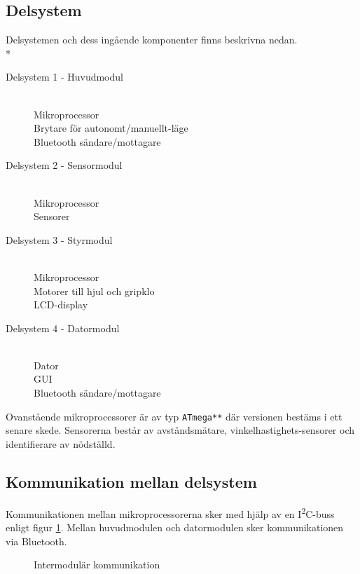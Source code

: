 \documentclass[11pt]{article}
\begin{document}
\begin{flushleft}
\subsection{Delsystem}
Delsystemen och dess ingående komponenter finns beskrivna nedan. \\*
\vspace{1em}
\begin{minipage}{\textwidth}
\begin{description}
	\item[Delsystem 1 - Huvudmodul] \hfill \\
	Mikroprocessor \\
	Brytare för autonomt/manuellt-läge \\
	Bluetooth\textsuperscript{\circledR} sändare/mottagare
	\item[Delsystem 2 - Sensormodul] \hfill \\
	Mikroprocessor \\
	Sensorer
	\item[Delsystem 3 - Styrmodul] \hfill \\
	Mikroprocessor \\
	Motorer till hjul och gripklo \\
	LCD-display
	\item[Delsystem 4 - Datormodul] \hfill \\
	Dator \\
	GUI \\
	Bluetooth\textsuperscript{\circledR} sändare/mottagare
\end{description}
\end{minipage}

Ovanstående mikroprocessorer är av typ \verb+ATmega**+ där versionen bestäms i ett senare skede. Sensorerna består av avståndsmätare, vinkelhastighets-sensorer och identifierare av nödställd. 
\subsection{Kommunikation mellan delsystem}
Kommunikationen mellan mikroprocessorerna sker med hjälp av en I\textsuperscript{2}C-buss enligt figur \ref{communication}. Mellan huvudmodulen och datormodulen sker kommunikationen via Bluetooth\textsuperscript{\circledR}.

\begin{figure}[htbp]
\noindent\resizebox{.97\textwidth}{!}{
	}
	\caption{Intermodulär kommunikation \label{communication}}
\end{figure}


\end{flushleft}
\end{document}
